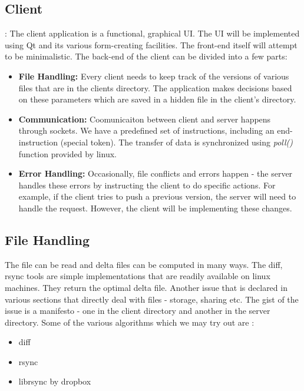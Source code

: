 \documentclass[]{article}
\begin{document}
\subsection{Client} :
The client application is a functional, graphical UI. The UI will be implemented using Qt and its various form-creating facilities. The front-end itself will attempt to be minimalistic.
The back-end of the client can be divided into a few parts:
\begin{itemize}
\item \textbf{File Handling:}
Every client needs to keep track of the versions of various files that are in the clients directory. The application makes decisions based on these parameters which are saved in a hidden file in the client's directory.
\item \textbf{Communication:}
Coomunicaiton between client and server happens through sockets. We have a predefined set of instructions, including an end-instruction (special token). The transfer of data is synchronized using \textit{poll()} function provided by linux.
\item \textbf{Error Handling:}
Occasionally, file conflicts and errors happen - the server handles these errors by instructing the client to do specific actions. For example, if the client tries to push a previous version, the server will need to handle the request. However, the client will be implementing these changes.
\end{itemize}

\subsection{File Handling}
The file can be read and delta files can be computed in many ways. The diff, rsync tools are simple implementations that are readily available on linux machines. They return the optimal delta file.
Another issue that is declared in various sections that directly deal with files - storage, sharing etc.
The gist of the issue is a manifesto - one in the client directory and another in the server directory.
Some of the various algorithms which we may try out are :
\begin{itemize}
\item diff
\item rsync
\item librsync by dropbox
\end{itemize}
\end{document}
